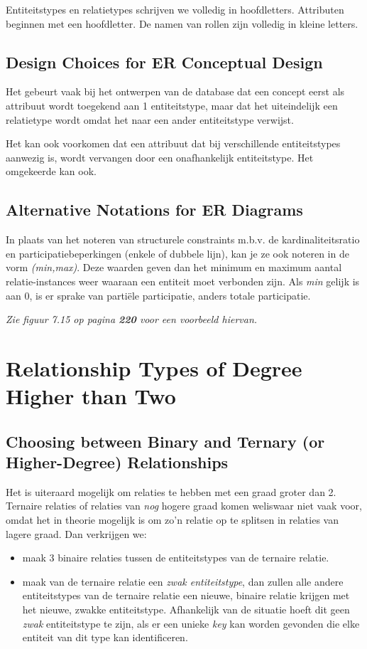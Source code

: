 Entiteitstypes en relatietypes schrijven we volledig in hoofdletters. Attributen beginnen met een hoofdletter. De namen van rollen zijn volledig in kleine letters.

\subsection{Design Choices for ER Conceptual Design}
Het gebeurt vaak bij het ontwerpen van de database dat een concept eerst als attribuut wordt toegekend aan 1 entiteitstype, maar dat het uiteindelijk een relatietype wordt omdat het naar een ander entiteitstype verwijst.

Het kan ook voorkomen dat een attribuut dat bij verschillende entiteitstypes aanwezig is, wordt vervangen door een onafhankelijk entiteitstype. Het omgekeerde kan ook.

\subsection{Alternative Notations for ER Diagrams}
In plaats van het noteren van structurele constraints m.b.v. de kardinaliteitsratio en participatiebeperkingen (enkele of dubbele lijn), kan je ze ook noteren in de vorm \textit{(min,max)}. Deze waarden geven dan het minimum en maximum aantal relatie-instances weer waaraan een entiteit moet verbonden zijn. Als \textit{min} gelijk is aan 0, is er sprake van parti\"ele participatie, anders totale participatie.

\textit{Zie figuur 7.15 op pagina \textbf{220} voor een voorbeeld hiervan.}


\section{Relationship Types of Degree Higher than Two}
\subsection{Choosing between Binary and Ternary (or Higher-Degree) Relationships}
Het is uiteraard mogelijk om relaties te hebben met een graad groter dan 2. Ternaire relaties of relaties van \textit{nog} hogere graad komen weliswaar niet vaak voor, omdat het in theorie mogelijk is om zo'n relatie op te splitsen in relaties van lagere graad. Dan verkrijgen we:
\begin{itemize}
\item maak 3 binaire relaties tussen de entiteitstypes van de ternaire relatie.
\item maak van de ternaire relatie een \textit{zwak entiteitstype}, dan zullen alle andere entiteitstypes van de ternaire relatie een nieuwe, binaire relatie krijgen met het nieuwe, zwakke entiteitstype. Afhankelijk van de situatie hoeft dit geen \textit{zwak} entiteitstype te zijn, als er een unieke \textit{key} kan worden gevonden die elke entiteit van dit type kan identificeren.
\end{itemize}

